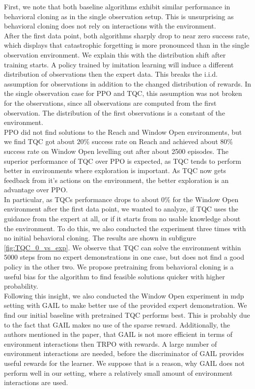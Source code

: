 First, we note that both baseline algorithms exhibit similar performance in behavioral cloning as in the single 
observation setup. This is unsurprising as behavioral cloning does not rely on interactions with the environment. \\

After the first data point, both algorithms sharply drop to near zero success rate, which displays that catastrophic forgetting is more 
pronounced than in the single observation environment. We explain this with the distribution shift after training starts. A policy trained by imitation learning 
will induce a different distribution of observations then the expert data. This breaks the i.i.d. assumption for observations in addition to the changed distribution of rewards. 
In the single observation case for PPO and TQC, this assumption was not broken for the observations, 
since all observations are computed from the first observation. The distribution of the first observations is a constant of the environment.\\

PPO did not find solutions to the Reach and Window Open environments, 
but we find TQC got about $20 \%$ success rate on Reach and achieved about $80 \%$ success rate on Window Open levelling out after about 2500 episodes. 
The superior performance of TQC over PPO is expected, as TQC tends to perform better in environments where exploration is important. As TQC now gets 
feedback from it's actions on the environment, the better exploration is an advantage over PPO.\\ 

In particular, as TQCs performance drops to about $0 \%$ for the Window Open 
environment after the first data point, we wanted to analyze, if TQC uses the guidance from the expert at all, or if it starts from 
no usable knowledge about the environment. To do this, we also conducted the experiment three times with no initial behavioral cloning. The results are shown in 
subfigure \ref{fig:TQC_0_vs_exp}. We observe that TQC can solve the environment within 5000 steps from no expert demonstrations in one case, but does not find a good policy in the other two. 
We propose pretraining from behavioral cloning is a useful bias for the algorithm to find feasible solutions quicker with higher probability.\\ 

Following this insight, 
we also conducted the Window Open experiment in \ac{mdp} setting with GAIL to make better use of the provided expert demonstration. We find our initial 
baseline with pretrained TQC performs best. This is probably due to the fact that GAIL makes no use of the sparse reward. Additionally, 
the authors mentioned in the paper, that GAIL is not more efficient in terms of environment interactions then TRPO with rewards. A large number of 
environment interactions are needed, before the discriminator of GAIL provides useful rewards for the learner. We suppose that is a reason, why GAIL does not perform 
well in our setting, where a relatively small amount of environment interactions are used. \\

